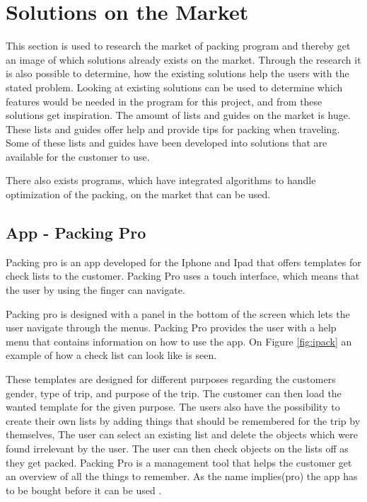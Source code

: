 \section{Solutions on the Market}
\label{sec:Solution}
This section is used to research the market of packing program and thereby get an image of which solutions already exists on the market. Through the research it is also possible to determine, how the existing solutions help the users with the stated problem. Looking at existing solutions can be used to determine which features would be needed in the program for this project, and from these solutions get inspiration.
The amount of lists and guides on the market is huge. These lists and guides offer help and provide tips for packing when traveling. Some of these lists and guides have been developed into solutions that are available for the customer to use.

There also exists programs, which have integrated algorithms to handle optimization of the packing, on the market that can be used.

\subsection{App - Packing Pro}

Packing pro is an app developed for the Iphone and Ipad that offers templates for check lists to the customer. Packing Pro uses a touch interface, which means that the user by using the finger can navigate.


Packing pro is designed with a panel in the bottom of the screen which lets the user navigate through the menus. Packing Pro provides the user with a help menu that contains information on how to use the app. On Figure \ref{fig:ipack} an example of how a check list can look like is seen.

These templates are designed for different purposes regarding the customers gender, type of trip, and purpose of the trip.
The customer can then load the wanted template for the given purpose. The users also have the possibility to create their own lists by adding things that should be remembered for the trip by themselves, The user can select an existing list and delete the objects which were found irrelevant by the user. The user can then check objects on the lists off as they get packed. Packing Pro is a management tool that helps the customer get an overview of all the things to remember. As the name implies(pro) the app has to be bought before it can be used  \citep{packingpro}.

